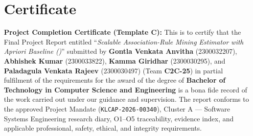 \chapter*{Certificate}

\begin{klbox}[KLSlate]
\textbf{Project Completion Certificate (Template C):} This is to certify that the Final Project Report entitled ``\emph{Scalable Association-Rule Mining Estimator with Apriori Baseline (\skarm)}'' submitted by \textbf{Gontla Venkata Anvitha} (2300032207), \textbf{Abhishek Kumar} (2300033822), \textbf{Kamma Giridhar} (2300030295), and \textbf{Paladagula Venkata Rajeev} (2300030497) (Team \textbf{C2C-25}) in partial fulfilment of the requirements for the award of the degree of \textbf{Bachelor of Technology in Computer Science and Engineering} is a bona fide record of the work carried out under our guidance and supervision. The report conforms to the approved Project Mandate (\texttt{KLCAP-2026-00340}), Cluster A --- Software Systems Engineering research diary, O1--O5 traceability, evidence index, and applicable professional, safety, ethical, and integrity requirements.
\end{klbox}

\vspace{3mm}
\begin{center}
\fontsize{9.5}{12.5}\selectfont
{}
\end{center}

\vspace{4mm}
